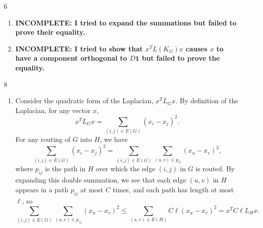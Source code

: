 \documentclass{article}
\newcommand{\incomplete}[1]{\textbf{INCOMPLETE: #1}}
\newcommand{\1}{\mathbf{1}}
\newcommand{\0}{\mathbf{0}}
\begin{document}
\begin{enumerate}
\begin{enumerate}
    First, by an induction similar to the one in part (a), we have
    \begin{equation*}
      P = \alpha D^{\frac{1}{2}} \left(\sum_{\ell = 0}^\infty (1 - \alpha)^\ell N^\ell\right) D^{-\frac{1}{2}}.
    \end{equation*}
    Next, if $v$ is an eigenvector of eigenvalue $\nu$ for a matrix $A$, then $v$ is an eigenvector of eigenvalue $\nu^\ell$ for matrix $A^\ell$.
    Thus substituting $N^\ell$ with its spectral decomposition yields
    \begin{equation*}
      P = \alpha D^{\frac{1}{2}} \left(\sum_{\ell = 0}^\infty (1 - \alpha)^\ell \sum_{k = 1}^n \nu_k^\ell v_k v_k^T \right) D^{-\frac{1}{2}}.
    \end{equation*}
    \incomplete{I'm not sure where to go from here.}
  \end{enumerate}
\item[6]
  \begin{enumerate}
  \item \incomplete{I tried to expand the summations but failed to prove their equality.}
  \item \incomplete{I tried to show that $x^T L(K_G) x$ causes $x$ to have a component orthogonal to $D \1$ but failed to prove the equality.}
  \end{enumerate}
\item[8]
  \begin{enumerate}
  \item
    Consider the quadratic form of the Laplacian, $x^T L_G x$.
    By definition of the Laplacian, for any vector $x$,
    \begin{equation*}
      x^T L_G x = \sum_{(i, j) \in E(G)} (x_i - x_j)^2.
    \end{equation*}
    For any routing of $G$ into $H$, we have
    \begin{equation*}
      \sum_{(i, j) \in E(G)} (x_i - x_j)^2 = \sum_{(i, j) \in E(G)} \sum_{(u, v) \in p_{ij}} (x_u - x_v)^2,
    \end{equation*}
    where $p_{ij}$ is the path in $H$ over which the edge $(i, j)$ in $G$ is routed.
    By expanding this double summation, we see that each edge $(u, v)$ in $H$ appears in a path $p_{ij}$ at most $C$ times, and each path has length at most $\ell$, so
    \begin{equation*}
      \sum_{(i, j) \in E(G)} \sum_{(u, v) \in p_{ij}} (x_u - x_v)^2 \leq \sum_{(u, v) \in E(H)} C \ell (x_u - x_v)^2 = x^T C \ell L_H x.
    \end{equation*}

\end{enumerate}
\end{enumerate}
\end{document}
